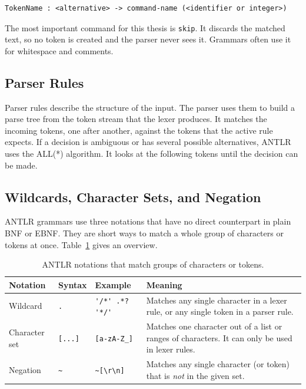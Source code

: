 \documentclass[thesis]{plai}
\begin{document}
\begin{lstlisting}[label={lst:lex-commands}, caption={Structure of a lexer command, based on~\cite{antlr-lex-rules}.}]
TokenName : <alternative> -> command-name (<identifier or integer>)
\end{lstlisting}

The most important command for this thesis is \texttt{skip}. It discards the matched text, so no token is created and the parser never sees it. Grammars often use it for whitespace and comments.

\subsection{Parser Rules}
Parser rules describe the structure of the input. The parser uses them to build a parse tree from the token stream that the lexer produces. It matches the incoming tokens, one after another, against the tokens that the active rule expects. If a decision is ambiguous or has several possible alternatives, ANTLR uses the ALL(*) algorithm. It looks at the following tokens until the decision can be made.

\subsection{Wildcards, Character Sets, and Negation}
\label{subsection:antlr-sets}
ANTLR grammars use three notations that have no direct counterpart in plain BNF or EBNF. They are short ways to match a whole group of characters or tokens at once. Table~\ref{tab:antlr-notations} gives an overview.

\begin{table}[htbp]
    \centering
    \small
    \begin{tabular}{@{}lllp{5.2cm}@{}}
        \toprule
        \textbf{Notation} & \textbf{Syntax} & \textbf{Example} & \textbf{Meaning} \\
        \midrule
        Wildcard
            & \verb|.|
            & \verb|'/*' .*? '*/'|
            & Matches any single character in a lexer rule, or any single token in a parser rule. \\
        Character set
            & \verb|[...]|
            & \verb|[a-zA-Z_]|
            & Matches one character out of a list or ranges of characters. It can only be used in lexer rules. \\
        Negation
            & \verb|~|
            & \verb|~[\r\n]|
            & Matches any single character (or token) that is \emph{not} in the given set. \\
        \bottomrule
    \end{tabular}
    \caption{ANTLR notations that match groups of characters or tokens.}
    \label{tab:antlr-notations}
\end{table}
\end{document}
